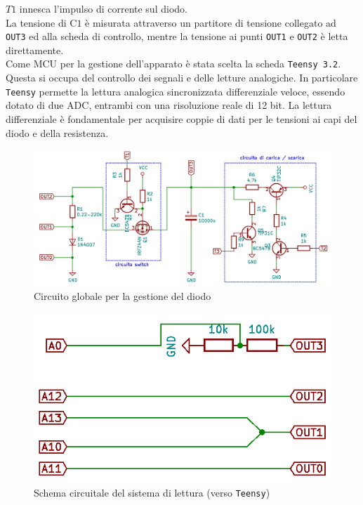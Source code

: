 \documentclass{article}[a4paper, oneside, 11pt]
\begin{document}
$T1$ innesca l'impulso di corrente sul diodo.\\
La tensione di C$1$ è misurata attraverso un partitore di tensione collegato ad 
\verb+OUT3+ ed alla scheda di controllo, mentre la tensione ai punti \verb+OUT1+ e
\verb+OUT2+ è letta direttamente.\\
Come MCU per la gestione dell'apparato è stata scelta la scheda 
\verb+Teensy 3.2+\cite{teensy}. Questa si occupa del controllo dei segnali e delle letture 
analogiche. In particolare \verb+Teensy+  permette la lettura analogica 
sincronizzata differenziale veloce, essendo dotato di due ADC, entrambi con una 
risoluzione reale di 12 bit. La lettura differenziale è fondamentale per 
acquisire coppie di dati per le tensioni ai capi del diodo e della 
resistenza.

\begin{figure}[H]
	\centering 
 		\includegraphics[scale=0.5]{./gestione.png}
 	\caption{Circuito globale per la gestione del diodo \label{sch:gest}}
\end{figure}
\begin{figure}[H]
	\centering 
 		\includegraphics[scale=0.5]{./measure.png}
 	\caption{Schema circuitale del sistema di lettura (verso \texttt{Teensy})
	\label{sch:rdng}}
\end{figure}
\end{document}
